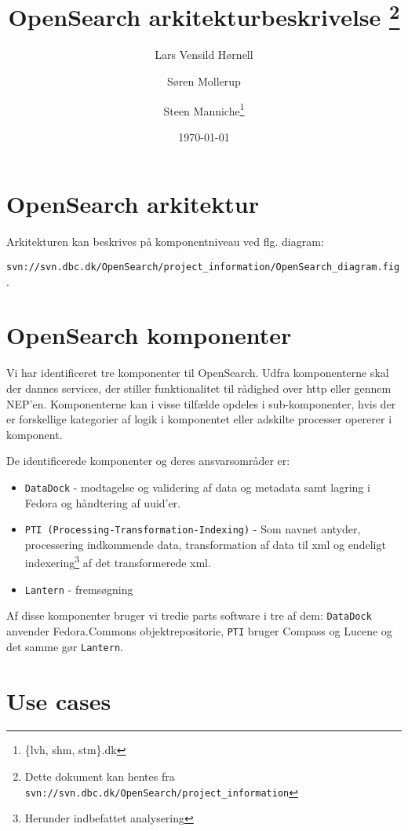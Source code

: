 \documentclass{article}
\author{Lars Vensild Hørnell \and Søren Mollerup \and Steen
  Manniche\thanks{\{lvh, shm, stm\}\@dbc.dk}}
\date{\today}
\title{OpenSearch arkitekturbeskrivelse \thanks{Dette dokument kan hentes fra \texttt{svn://svn.dbc.dk/OpenSearch/project\_information}}}
\begin{document}
\maketitle

\newpage

\tableofcontents

\section{OpenSearch arkitektur}
\label{sec:arkitektur}

Arkitekturen kan beskrives på komponentniveau ved flg. diagram:

\texttt{svn://svn.dbc.dk/OpenSearch/project\_information/OpenSearch\_diagram.fig}.



\section{OpenSearch komponenter}
\label{sec:komponent}

Vi har identificeret tre komponenter til OpenSearch. Udfra
komponenterne skal der dannes services, der stiller funktionalitet til
rådighed over http eller gennem NEP'en. Komponenterne kan i visse
tilfælde opdeles i sub-komponenter, hvis der er forskellige kategorier
af logik i komponentet eller adskilte processer opererer i komponent.

De identificerede komponenter og deres ansvarsområder er:

\begin{itemize}
\item \texttt{DataDock} - modtagelse og validering af data og metadata
  samt lagring i Fedora og håndtering af uuid'er.

\item \texttt{PTI (Processing-Transformation-Indexing)} - Som navnet
  antyder, processering indkommende data, transformation af data til
  xml og endeligt indexering\footnote{Herunder indbefattet
    analysering} af det transformerede xml.

\item \texttt{Lantern} - fremsøgning
\end{itemize}

Af disse komponenter bruger vi tredie parts software i tre af dem:
\texttt{DataDock} anvender Fedora.Commons objektrepositorie,
\texttt{PTI} bruger Compass og Lucene og det samme gør
\texttt{Lantern}.

\section{Use cases}
\label{sec:usecases}
\end{document}
